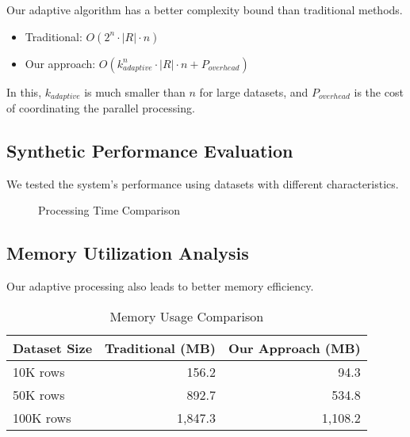 \documentclass[sigconf]{acmart}
\begin{document}
Our adaptive algorithm has a better complexity bound than traditional methods.

\begin{itemize}
\item Traditional: $O(2^n \cdot |R| \cdot n)$
\item Our approach: $O(k^n_{adaptive} \cdot |R| \cdot n + P_{overhead})$
\end{itemize}

In this, $k_{adaptive}$ is much smaller than $n$ for large datasets, and $P_{overhead}$ is the cost of coordinating the parallel processing.

\subsection{Synthetic Performance Evaluation}

We tested the system's performance using datasets with different characteristics.

\begin{figure}[h]
\centering
{}
\caption{Processing Time Comparison}
\label{fig:performance}
\end{figure}

\subsection{Memory Utilization Analysis}

Our adaptive processing also leads to better memory efficiency.

\begin{table}[h]
\centering
\caption{Memory Usage Comparison}
\label{tab:memory}
\begin{tabular}{@{}lrr@{}}
\toprule
Dataset Size & Traditional (MB) & Our Approach (MB) \\
\midrule
10K rows & 156.2 & 94.3 \\
50K rows & 892.7 & 534.8 \\
100K rows & 1,847.3 & 1,108.2 \\
\bottomrule
\end{tabular}
\end{table}
\end{document}
